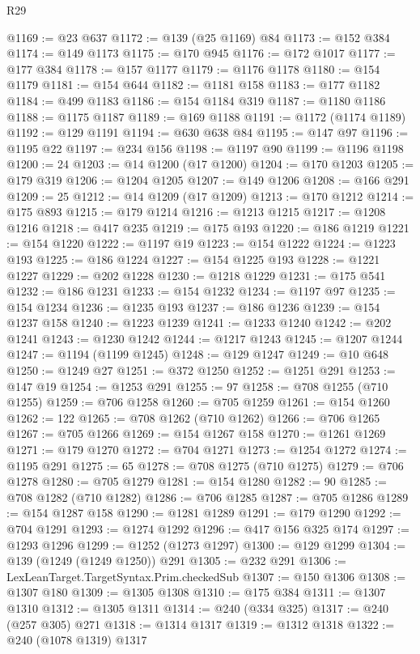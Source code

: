 \begin{lexlean}{R29}
\begin{coremodule}
@1169 := @23 @637
@1172 := @139 (@25 @1169) @84
@1173 := @152 @384
@1174 := @149 @1173
@1175 := @170 @945
@1176 := @172 @1017
@1177 := @177 @384
@1178 := @157 @1177
@1179 := @1176 @1178
@1180 := @154 @1179
@1181 := @154 @644
@1182 := @1181 @158
@1183 := @177 @1182
@1184 := @499 @1183
@1186 := @154 @1184 @319
@1187 := @1180 @1186
@1188 := @1175 @1187
@1189 := @169 @1188
@1191 := @1172 (@1174 @1189)
@1192 := @129 @1191
@1194 := @630 @638 @84
@1195 := @147 @97
@1196 := @1195 @22
@1197 := @234 @156
@1198 := @1197 @90
@1199 := @1196 @1198
@1200 := 24
@1203 := @14 @1200 (@17 @1200)
@1204 := @170 @1203
@1205 := @179 @319
@1206 := @1204 @1205
@1207 := @149 @1206
@1208 := @166 @291
@1209 := 25
@1212 := @14 @1209 (@17 @1209)
@1213 := @170 @1212
@1214 := @175 @893
@1215 := @179 @1214
@1216 := @1213 @1215
@1217 := @1208 @1216
@1218 := @417 @235
@1219 := @175 @193
@1220 := @186 @1219
@1221 := @154 @1220
@1222 := @1197 @19
@1223 := @154 @1222
@1224 := @1223 @193
@1225 := @186 @1224
@1227 := @154 @1225 @193
@1228 := @1221 @1227
@1229 := @202 @1228
@1230 := @1218 @1229
@1231 := @175 @541
@1232 := @186 @1231
@1233 := @154 @1232
@1234 := @1197 @97
@1235 := @154 @1234
@1236 := @1235 @193
@1237 := @186 @1236
@1239 := @154 @1237 @158
@1240 := @1223 @1239
@1241 := @1233 @1240
@1242 := @202 @1241
@1243 := @1230 @1242
@1244 := @1217 @1243
@1245 := @1207 @1244
@1247 := @1194 (@1199 @1245)
@1248 := @129 @1247
@1249 := @10 @648
@1250 := @1249 @27
@1251 := @372 @1250
@1252 := @1251 @291
@1253 := @147 @19
@1254 := @1253 @291
@1255 := 97
@1258 := @708 @1255 (@710 @1255)
@1259 := @706 @1258
@1260 := @705 @1259
@1261 := @154 @1260
@1262 := 122
@1265 := @708 @1262 (@710 @1262)
@1266 := @706 @1265
@1267 := @705 @1266
@1269 := @154 @1267 @158
@1270 := @1261 @1269
@1271 := @179 @1270
@1272 := @704 @1271
@1273 := @1254 @1272
@1274 := @1195 @291
@1275 := 65
@1278 := @708 @1275 (@710 @1275)
@1279 := @706 @1278
@1280 := @705 @1279
@1281 := @154 @1280
@1282 := 90
@1285 := @708 @1282 (@710 @1282)
@1286 := @706 @1285
@1287 := @705 @1286
@1289 := @154 @1287 @158
@1290 := @1281 @1289
@1291 := @179 @1290
@1292 := @704 @1291
@1293 := @1274 @1292
@1296 := @417 @156 @325 @174
@1297 := @1293 @1296
@1299 := @1252 (@1273 @1297)
@1300 := @129 @1299
@1304 := @139 (@1249 (@1249 @1250)) @291
@1305 := @232 @291
@1306 := LexLeanTarget.TargetSyntax.Prim.checkedSub
@1307 := @150 @1306
@1308 := @1307 @180
@1309 := @1305 @1308
@1310 := @175 @384
@1311 := @1307 @1310
@1312 := @1305 @1311
@1314 := @240 (@334 @325)
@1317 := @240 (@257 @305) @271
@1318 := @1314 @1317
@1319 := @1312 @1318
@1322 := @240 (@1078 @1319) @1317

\end{coremodule}
\end{lexlean}
